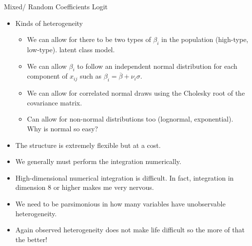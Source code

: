 \documentclass[xcolor=pdftex,dvipsnames,table,mathserif,aspectratio=169]{beamer}
\begin{document}
%

\begin{frame}{Mixed/ Random Coefficients Logit}
\begin{itemize}
\item Kinds of heterogeneity
\begin{itemize}
\item We can allow for there to be two types of $\beta_i$ in the population (high-type, low-type). \alert{latent class model}.
\item We can allow $\beta_i$ to follow an independent normal distribution for each component of $x_{ij}$ such as $\beta_i = \overline{\beta} + \nu_i \sigma$.
\item We can allow for correlated normal draws using the Cholesky root of the covariance matrix.
\item Can allow for non-normal distributions too (lognormal, exponential). Why is normal so easy?
\end{itemize}
\item The structure is extremely flexible but at a cost.
\item We generally must perform the integration numerically.
\item High-dimensional numerical integration is difficult. In fact, integration in dimension 8 or higher makes me very nervous.
\item We need to be parsimonious in how many variables have unobservable heterogeneity.
\item Again observed heterogeneity does not make life difficult so the more of that the better!
\end{itemize}
\end{frame}
\end{document}
